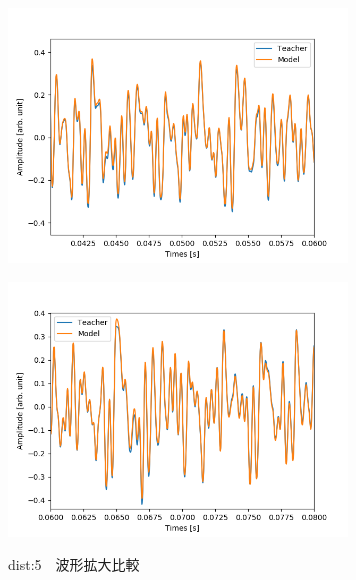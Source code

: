 \documentclass{jreport}		%
\begin{document}
\begin{figure}[htbp]
 \begin{minipage}{0.5\hsize}
 \begin{center}
  \includegraphics[width=90mm]{gain5_output_hikaku3.png}
 \end{center}
 \label{fig:one}
 \end{minipage}
 \begin{minipage}{0.5\hsize}
 \begin{center}
  \includegraphics[width=90mm]{gain5_output_hikaku4.png}
 \end{center}
 \label{fig:two}
 \end{minipage}
 \caption{dist:5　波形拡大比較}
\end{figure}
\end{document}
